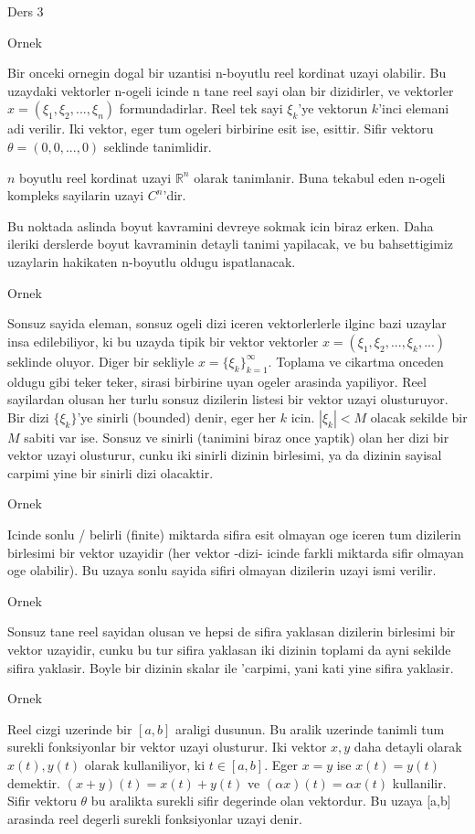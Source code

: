 \documentclass[12pt,fleqn]{article}
\begin{document}
Ders 3

Ornek 

Bir onceki ornegin dogal bir uzantisi n-boyutlu reel kordinat uzayi
olabilir. Bu uzaydaki vektorler n-ogeli icinde n tane reel sayi olan bir
dizidirler, ve vektorler $x = (\xi_1, \xi_2,...,\xi_n)$
formundadirlar. Reel tek sayi $\xi_k$'ye vektorun $k$'inci elemani adi
verilir. Iki vektor, eger tum ogeleri birbirine esit ise, esittir. Sifir
vektoru $\theta = (0,0,...,0)$ seklinde tanimlidir. 

$n$ boyutlu reel kordinat uzayi $\mathbb{R}^n$ olarak tanimlanir. Buna tekabul eden
n-ogeli kompleks sayilarin uzayi $C^n$'dir. 

Bu noktada aslinda boyut kavramini devreye sokmak icin biraz erken. Daha
ileriki derslerde boyut kavraminin detayli tanimi yapilacak, ve bu
bahsettigimiz uzaylarin hakikaten n-boyutlu oldugu ispatlanacak. 

Ornek 

Sonsuz sayida eleman, sonsuz ogeli dizi iceren vektorlerlerle ilginc bazi
uzaylar insa edilebiliyor, ki bu uzayda tipik bir vektor vektorler 
$x =
(\xi_1, \xi_2,...,\xi_k,...)$ seklinde oluyor. Diger bir sekliyle $x =
\{\xi_k\} _{k=1}^{\infty}$. 
Toplama ve cikartma onceden oldugu gibi teker teker, sirasi birbirine uyan
ogeler arasinda yapiliyor. Reel sayilardan olusan her turlu sonsuz
dizilerin listesi bir vektor uzayi olusturuyor. Bir dizi $\{\xi_k\}$'ye
sinirli (bounded) denir, eger her $k$ icin.  $|\xi_k| < M$ olacak sekilde
bir $M$ sabiti var ise. Sonsuz ve sinirli (tanimini biraz once yaptik) olan 
her dizi bir vektor uzayi olusturur, cunku iki sinirli dizinin birlesimi, ya
da dizinin sayisal carpimi yine bir sinirli dizi olacaktir. 

Ornek 

Icinde sonlu / belirli (finite) miktarda sifira esit olmayan oge iceren tum
dizilerin birlesimi bir vektor uzayidir (her vektor -dizi- icinde farkli
miktarda sifir olmayan oge olabilir). Bu uzaya sonlu sayida sifiri olmayan
dizilerin uzayi ismi verilir. 

Ornek

Sonsuz tane reel sayidan olusan ve hepsi de sifira yaklasan dizilerin
birlesimi bir vektor uzayidir, cunku bu tur sifira yaklasan iki dizinin
toplami da ayni sekilde sifira yaklasir. Boyle bir dizinin skalar ile
'carpimi, yani kati yine sifira yaklasir. 

Ornek 

Reel cizgi uzerinde bir $[a,b]$ araligi dusunun. Bu aralik uzerinde tanimli
tum surekli fonksiyonlar bir vektor uzayi olusturur. Iki vektor $x,y$ daha
detayli olarak $x(t),y(t)$ olarak kullaniliyor, ki $t \in [a,b]$. Eger $x =
y$ ise 
$x(t) = y(t)$ demektir. $(x+y)(t) = x(t) + y(t)$ ve $(\alpha x)(t) =
\alpha x(t)$ kullanilir. 
Sifir vektoru $\theta$ bu aralikta surekli sifir degerinde olan vektordur. 
Bu uzaya [a,b] arasinda reel degerli surekli fonksiyonlar uzayi denir. 
\end{document}
